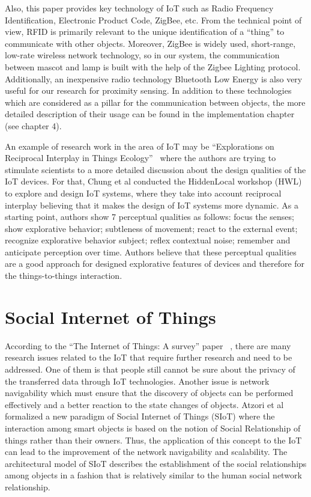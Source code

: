 Also, this paper provides key technology of IoT such as Radio Frequency Identification,
Electronic Product Code, ZigBee, etc.
From the technical point of view, RFID is primarily relevant to the unique identification of
a “thing” to communicate with other objects.
Moreover, ZigBee is widely used, short-range, low-rate wireless network technology, so in our
system, the communication between mascot and lamp is built with the help of the Zigbee Lighting protocol.
Additionally, an inexpensive radio technology Bluetooth Low Energy is also very useful
for our research for proximity sensing.
In addition to these technologies which are considered as a pillar for the communication between
objects, the more detailed description of their usage can be found in the implementation chapter (see chapter 4).

An example of research work in the area of IoT may be “Explorations on Reciprocal
Interplay in Things Ecology”~\cite{chung2018explorations} where the authors are trying to
stimulate scientists to a more detailed discussion about the design qualities of the IoT devices.
For that, Chung et al conducted the HiddenLocal workshop (HWL) to explore and design
IoT systems, where they take into account reciprocal interplay believing that it makes the
design of IoT systems more dynamic.
As a starting point, authors show 7 perceptual qualities as follows: focus the senses;
show explorative behavior;
subtleness of movement;
react to the external event;
recognize explorative behavior subject;
reflex contextual noise;
remember and anticipate perception over time.
Authors believe that these perceptual qualities are a good approach for designed explorative
features of devices and therefore for the things-to-things interaction.

\section{Social Internet of Things}
\label{sec:Social Internet of Things}
According to the “The Internet of Things: A survey” paper ~\cite{atzori2010internet},
there are many research issues related to the IoT that require further
research and need to be addressed.
One of them is that people still cannot be sure about the privacy of the transferred data
through IoT technologies.
Another issue is network navigability which must ensure that the discovery of objects can be
performed effectively and a better reaction to the state changes of objects.
Atzori et al ~\cite{atzori2011siot} formalized a new paradigm of Social Internet of Things (SIoT)
where the interaction among smart objects is based on the notion of Social
Relationship of things rather than their owners.
Thus, the application of this concept to the IoT can lead to the improvement
of the network navigability and scalability.
The architectural model of SIoT describes the establishment of the social relationships
among objects in a fashion that is relatively similar to the human social network relationship.

